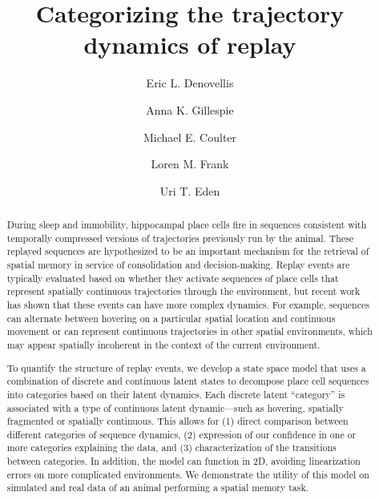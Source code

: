 \documentclass[times, twoside, watermark]{zHenriquesLab-StyleBioRxiv}
\begin{document}
\title{Categorizing the trajectory dynamics of replay}

\author[1,\Letter]{Eric L. Denovellis}
\author[2, 3]{Anna K. Gillespie}
\author[2, 3]{Michael E. Coulter}
\author[2, 3, 4]{Loren M. Frank}
\author[1]{Uri T. Eden}


\maketitle

\begin{abstract}
During sleep and immobility, hippocampal place cells fire in sequences consistent with temporally compressed versions of trajectories previously run by the animal. These replayed sequences are hypothesized to be an important mechanism for the retrieval of spatial memory in service of consolidation and decision-making. Replay events are typically evaluated based on whether they activate sequences of place cells that represent spatially continuous trajectories through the environment, but recent work has shown that these events can have more complex dynamics. For example, sequences can alternate between hovering on a particular spatial location and continuous movement or can represent continuous trajectories in other spatial environments, which may appear spatially incoherent in the context of the current environment.
 
To quantify the structure of replay events, we develop a state space model that uses a combination of discrete and continuous latent states to decompose place cell sequences into categories based on their latent dynamics. Each discrete latent “category” is associated with a type of continuous latent dynamic—such as hovering, spatially fragmented or spatially continuous. This allows for (1) direct comparison between different categories of sequence dynamics, (2) expression of our confidence in one or more categories explaining the data, and (3) characterization of the transitions between categories. In addition, the model can function in 2D, avoiding linearization errors on more complicated environments. We demonstrate the utility of this model on simulated and real data of an animal performing a spatial memory task.

\end {abstract}
\end{document}
